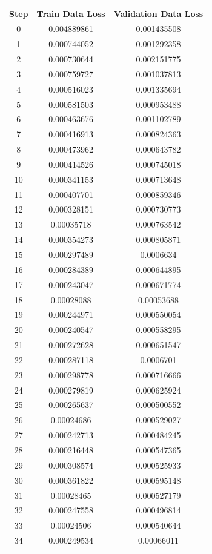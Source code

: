\documentclass{jreport}		%
\begin{document}
\begin{table}
  \begin{tabular}{c|cc} \hline
Step&Train Data Loss&Validation Data Loss \\ \hline
0&0.004889861&0.001435508 \\
1&0.000744052&0.001292358 \\
2&0.000730644&0.002151775 \\
3&0.000759727&0.001037813 \\
4&0.000516023&0.001335694 \\
5&0.000581503&0.000953488 \\
6&0.000463676&0.001102789 \\
7&0.000416913&0.000824363 \\
8&0.000473962&0.000643782 \\
9&0.000414526&0.000745018 \\
10&0.000341153&0.000713648 \\
11&0.000407701&0.000859346 \\
12&0.000328151&0.000730773 \\
13&0.00035718&0.000763542 \\
14&0.000354273&0.000805871 \\
15&0.000297489&0.0006634 \\
16&0.000284389&0.000644895 \\
17&0.000243047&0.000671774 \\
18&0.00028088&0.00053688 \\
19&0.000244971&0.000550054 \\
20&0.000240547&0.000558295 \\
21&0.000272628&0.000651547 \\
22&0.000287118&0.0006701 \\
23&0.000298778&0.000716666 \\
24&0.000279819&0.000625924 \\
25&0.000265637&0.000500552 \\
26&0.00024686&0.000529027 \\
27&0.000242713&0.000484245 \\
28&0.000216448&0.000547365 \\
29&0.000308574&0.000525933 \\
30&0.000361822&0.000595148 \\
31&0.00028465&0.000527179 \\
32&0.000247558&0.000496814 \\
33&0.00024506&0.000540644 \\
34&0.000249534&0.00066011 \\

\end{tabular}
\end{table}
\end{document}

